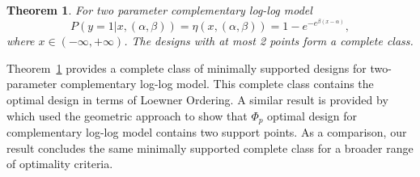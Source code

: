 \documentclass[12pt]{amsart}
\newtheorem{theorem}{Theorem}[section]
\theoremstyle{definition}
\theoremstyle{remark}
\numberwithin{equation}{section}
\begin{document}


\begin{theorem}\label{comp}
For two parameter complementary log-log model\[
P(y=1|x,(\alpha,\beta)) = \eta(x,(\alpha,\beta))= 1-e^{-e^{\beta(x-\alpha)}},
\] where $x\in (-\infty,+\infty)$. The designs with at most 2 points form a complete class.
\end{theorem}


Theorem~\ref{comp} provides a complete class of minimally supported designs for two-parameter complementary log-log model. This complete class contains the optimal design in terms of Loewner Ordering. A similar result is provided by \cite{biedermann2006} which used the geometric approach to show that $\Phi_p$ optimal design for complementary log-log model contains two support points. As a comparison, our result concludes the same minimally supported complete class for a broader range of optimality criteria.
\end{document}

